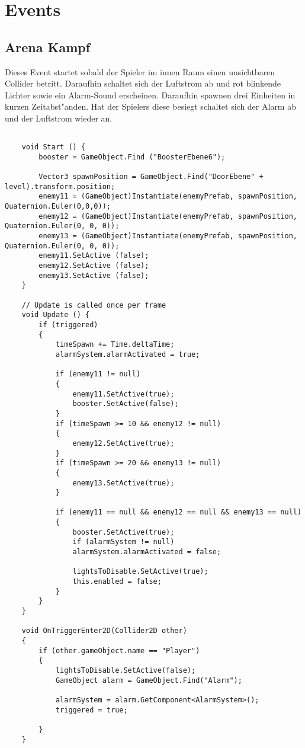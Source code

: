 \chapter{Events}

\section {Arena Kampf}
Dieses Event startet sobald der Spieler im innen Raum einen unsichtbaren Collider betritt. Daraufhin schaltet sich der Luftstrom ab und rot blinkende Lichter sowie ein Alarm-Sound erscheinen. Daraufhin spawnen drei Einheiten in kurzen Zeitabst"anden. Hat der Spielers diese besiegt schaltet sich der Alarm ab und der Luftstrom wieder an.

\begin{lstlisting}[breaklines = true]

	void Start () {
		booster = GameObject.Find ("BoosterEbene6");
		
		Vector3 spawnPosition = GameObject.Find("DoorEbene" + level).transform.position;
		enemy11 = (GameObject)Instantiate(enemyPrefab, spawnPosition, Quaternion.Euler(0,0,0));
		enemy12 = (GameObject)Instantiate(enemyPrefab, spawnPosition, Quaternion.Euler(0, 0, 0));
		enemy13 = (GameObject)Instantiate(enemyPrefab, spawnPosition, Quaternion.Euler(0, 0, 0));
		enemy11.SetActive (false);
		enemy12.SetActive (false);
		enemy13.SetActive (false);
	}
	
	// Update is called once per frame
	void Update () {
		if (triggered)
		{
			timeSpawn += Time.deltaTime;
			alarmSystem.alarmActivated = true;
			
			if (enemy11 != null)
			{
				enemy11.SetActive(true);
				booster.SetActive(false);
			}
			if (timeSpawn >= 10 && enemy12 != null)
			{
				enemy12.SetActive(true);
			}
			if (timeSpawn >= 20 && enemy13 != null)
			{
				enemy13.SetActive(true);
			}
			
			if (enemy11 == null && enemy12 == null && enemy13 == null)
			{
				booster.SetActive(true);
				if (alarmSystem != null)
				alarmSystem.alarmActivated = false;
				
				lightsToDisable.SetActive(true);
				this.enabled = false;
			}
		}
	}
		
	void OnTriggerEnter2D(Collider2D other)
	{
		if (other.gameObject.name == "Player")
		{
			lightsToDisable.SetActive(false);
			GameObject alarm = GameObject.Find("Alarm");
				
			alarmSystem = alarm.GetComponent<AlarmSystem>();
			triggered = true;
		
		}
	}

\end{lstlisting}